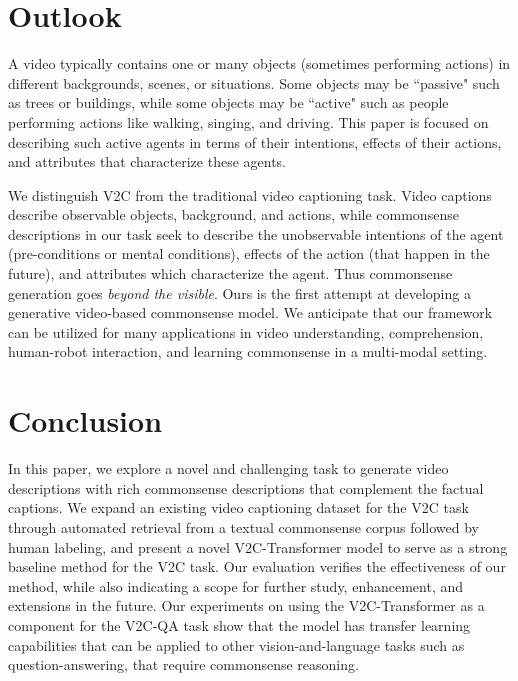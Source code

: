 \section{Outlook}
A video typically contains one or many objects (sometimes performing actions) in different backgrounds, scenes, or situations.
Some objects may be ``passive" such as trees or buildings, while some objects may be ``active" such as people performing actions like walking, singing, and driving.
This paper is focused on describing such active agents in terms of their intentions, effects of their actions, and attributes that characterize these agents.

We distinguish V2C from the traditional video captioning task.
Video captions describe observable objects, background, and actions, while commonsense descriptions in our task seek to describe the unobservable intentions of the agent (pre-conditions or mental conditions), effects of the action (that happen in the future), and attributes which characterize the agent.
Thus commonsense generation goes \textit{beyond the visible}.
Ours is the first attempt at developing a generative video-based commonsense model.
We anticipate that our framework can be utilized for many applications in video understanding, comprehension, human-robot interaction, and learning commonsense in a multi-modal setting.


\section{Conclusion}
In this paper, we explore a novel and challenging task to generate video descriptions with rich commonsense descriptions that complement the factual captions.
We expand an existing video captioning dataset for the V2C task through automated retrieval from a textual commonsense corpus followed by human labeling, and present a novel V2C-Transformer model to serve as a strong baseline method for the V2C task. 
Our evaluation verifies the effectiveness of our method, while also indicating a scope for further study, enhancement, and extensions in the future. 
Our experiments on using the V2C-Transformer as a component for the V2C-QA task show that the model has transfer learning capabilities that can be applied to other vision-and-language tasks such as question-answering, that require commonsense reasoning.

% 
% 

% 
